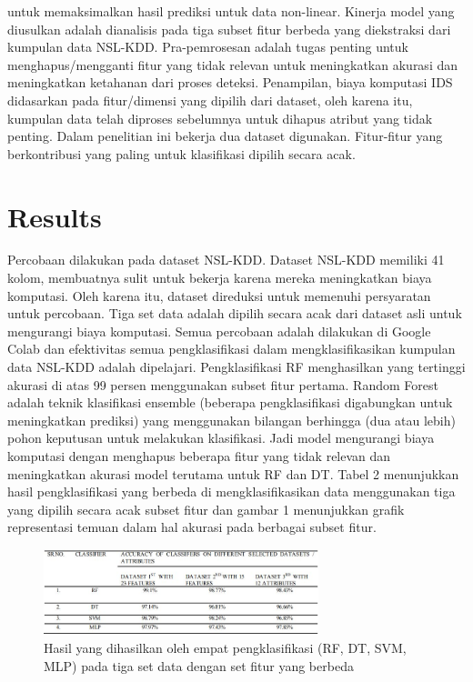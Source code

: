 \documentclass[conference]{IEEEtran}
\begin{document}
untuk memaksimalkan hasil prediksi untuk data non-linear. Kinerja model yang diusulkan adalah dianalisis pada tiga subset fitur berbeda yang diekstraksi dari kumpulan data NSL-KDD. Pra-pemrosesan adalah tugas penting untuk menghapus/mengganti fitur yang tidak relevan untuk meningkatkan akurasi dan meningkatkan ketahanan dari proses deteksi. Penampilan, biaya komputasi IDS didasarkan pada fitur/dimensi yang dipilih dari dataset, oleh karena itu, kumpulan data telah diproses sebelumnya untuk dihapus atribut yang tidak penting. Dalam penelitian ini bekerja dua dataset digunakan. Fitur-fitur yang berkontribusi yang paling untuk klasifikasi dipilih secara acak.

\section{Results}
Percobaan dilakukan pada dataset NSL-KDD. Dataset NSL-KDD memiliki 41 kolom, membuatnya sulit untuk bekerja karena mereka meningkatkan biaya komputasi. Oleh karena itu, dataset direduksi untuk memenuhi persyaratan untuk percobaan. Tiga set data adalah dipilih secara acak dari dataset asli untuk mengurangi biaya komputasi. Semua percobaan adalah dilakukan di Google Colab dan efektivitas semua pengklasifikasi dalam mengklasifikasikan kumpulan data NSL-KDD adalah dipelajari. Pengklasifikasi RF menghasilkan yang tertinggi akurasi di atas 99 persen menggunakan subset fitur pertama. Random Forest adalah teknik klasifikasi ensemble (beberapa pengklasifikasi digabungkan untuk meningkatkan prediksi) yang menggunakan bilangan berhingga (dua atau lebih) pohon keputusan untuk melakukan klasifikasi. Jadi model mengurangi biaya komputasi dengan menghapus beberapa fitur yang tidak relevan dan meningkatkan akurasi model terutama untuk RF dan DT. Tabel 2 menunjukkan hasil pengklasifikasi yang berbeda di mengklasifikasikan data menggunakan tiga yang dipilih secara acak subset fitur dan gambar 1 menunjukkan grafik representasi temuan dalam hal akurasi pada berbagai subset fitur.

\begin{figure}
    \includegraphics[width=80mm]{Gambar/gambar2.JPG}
    \caption{Hasil yang dihasilkan oleh empat pengklasifikasi (RF, DT, SVM, MLP) pada tiga set data dengan set fitur yang berbeda}
    \label{fig2}
\end{figure}
\end{document}
